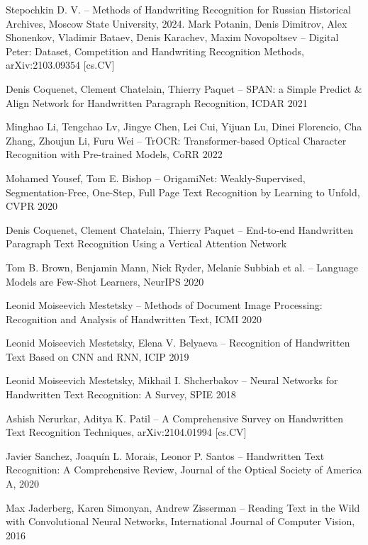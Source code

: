 \documentclass{article}
\begin{document}
\begin{thebibliography}{00}
	Stepochkin D. V. -- Methods of Handwriting Recognition for Russian Historical Archives, Moscow State University, 2024.
	Mark Potanin, Denis Dimitrov, Alex Shonenkov, Vladimir Bataev, Denis Karachev, Maxim Novopoltsev -- Digital Peter: Dataset, Competition and Handwriting Recognition Methods, arXiv:2103.09354 [cs.CV]
	
	Denis Coquenet, Clement Chatelain, Thierry Paquet -- SPAN: a Simple Predict \& Align Network for Handwritten Paragraph Recognition, ICDAR 2021
	
	Minghao Li, Tengchao Lv, Jingye Chen, Lei Cui, Yijuan Lu, Dinei Florencio, Cha Zhang, Zhoujun Li, Furu Wei -- TrOCR: Transformer-based Optical Character Recognition with Pre-trained Models, CoRR 2022
	
	Mohamed Yousef, Tom E. Bishop -- OrigamiNet: Weakly-Supervised, Segmentation-Free, One-Step, Full Page Text Recognition by Learning to Unfold, CVPR 2020
	
	Denis Coquenet, Clement Chatelain, Thierry Paquet -- End-to-end Handwritten Paragraph Text Recognition Using a Vertical Attention Network
	
	Tom B. Brown, Benjamin Mann, Nick Ryder, Melanie Subbiah et al. -- Language Models are Few-Shot Learners, NeurIPS 2020
	
	Leonid Moiseevich Mestetsky -- Methods of Document Image Processing: Recognition and Analysis of Handwritten Text, ICMI 2020
	
	Leonid Moiseevich Mestetsky, Elena V. Belyaeva -- Recognition of Handwritten Text Based on CNN and RNN, ICIP 2019
	
	Leonid Moiseevich Mestetsky, Mikhail I. Shcherbakov -- Neural Networks for Handwritten Text Recognition: A Survey, SPIE 2018
	
	Ashish Nerurkar, Aditya K. Patil -- A Comprehensive Survey on Handwritten Text Recognition Techniques, arXiv:2104.01994 [cs.CV]
	
	Javier Sanchez, Joaquín L. Morais, Leonor P. Santos -- Handwritten Text Recognition: A Comprehensive Review, Journal of the Optical Society of America A, 2020
	
Max Jaderberg, Karen Simonyan, Andrew Zisserman -- Reading Text in the Wild with Convolutional Neural Networks, International Journal of Computer Vision, 2016
	

\end{thebibliography}
\end{document}
